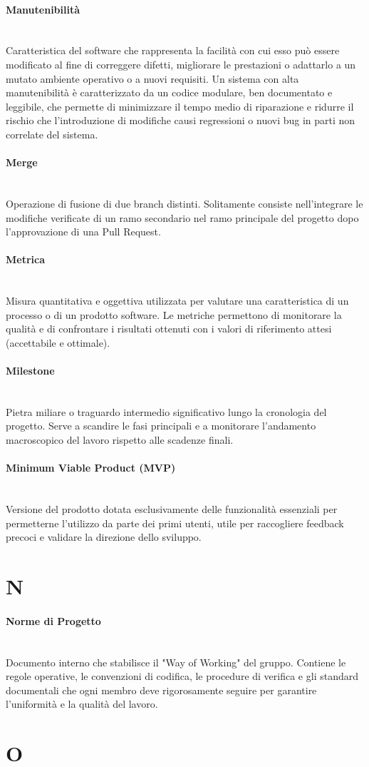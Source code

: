 \documentclass[a4paper, 10pt, colorlinks=true, linkcolor=black, urlcolor=blue, citecolor=blue, hidelinks]{article}
\newcommand{\glossaryterm}[2]{
    \paragraph{#1 \label{term:#1}} \mbox{} \\
    #2
    \vspace{0.5em}
}
\begin{document}
\glossaryterm{Manutenibilità}{Caratteristica del software che rappresenta la facilità con cui esso può essere modificato al fine di correggere difetti, migliorare le prestazioni o adattarlo a un mutato ambiente operativo o a nuovi requisiti. Un sistema con alta manutenibilità è caratterizzato da un codice modulare, ben documentato e leggibile, che permette di minimizzare il tempo medio di riparazione e ridurre il rischio che l'introduzione di modifiche causi regressioni o nuovi bug in parti non correlate del sistema.}

\glossaryterm{Merge}{Operazione di fusione di due branch distinti. Solitamente consiste nell'integrare le modifiche verificate di un ramo secondario nel ramo principale del progetto dopo l'approvazione di una Pull Request.}

\glossaryterm{Metrica}{Misura quantitativa e oggettiva utilizzata per valutare una caratteristica di un processo o di un prodotto software. Le metriche permettono di monitorare la qualità e di confrontare i risultati ottenuti con i valori di riferimento attesi (accettabile e ottimale).}

\glossaryterm{Milestone}{Pietra miliare o traguardo intermedio significativo lungo la cronologia del progetto. Serve a scandire le fasi principali e a monitorare l'andamento macroscopico del lavoro rispetto alle scadenze finali.}

\glossaryterm{Minimum Viable Product (MVP)}{Versione del prodotto dotata esclusivamente delle funzionalità essenziali per permetterne l'utilizzo da parte dei primi utenti, utile per raccogliere feedback precoci e validare la direzione dello sviluppo.}

\newpage

\section*{N}

\glossaryterm{Norme di Progetto}{Documento interno che stabilisce il "Way of Working" del gruppo. Contiene le regole operative, le convenzioni di codifica, le procedure di verifica e gli standard documentali che ogni membro deve rigorosamente seguire per garantire l'uniformità e la qualità del lavoro.}

\newpage

\section*{O}
\end{document}
